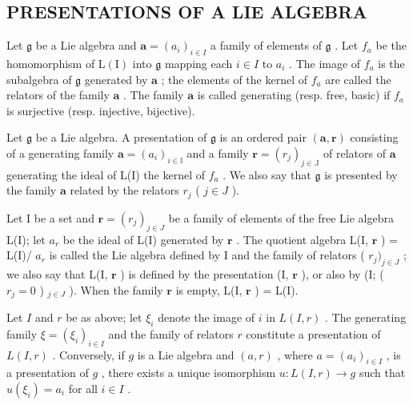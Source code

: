 \subsection{PRESENTATIONS OF A LIE ALGEBRA}

Let \(\mathfrak{g}\) be a Lie algebra and \(\pmb{a} = (a_i)_{i\in I}\) a family of elements of \(\mathfrak{g}\) . Let \(f_{a}\) be the homomorphism of \(\mathrm{L(I)}\) into \(\mathfrak{g}\) mapping each \(i\in I\) to \(a_{i}\) . The image of \(f_{a}\) is the subalgebra of \(\mathfrak{g}\) generated by \(\pmb{a}\) ; the elements of the kernel of \(f_{a}\) are called the relators of the family \(\pmb{a}\) . The family \(\pmb{a}\) is called generating (resp. free, basic) if \(f_{a}\) is surjective (resp. injective, bijective).

Let \(\mathfrak{g}\) be a Lie algebra. A presentation of \(\mathfrak{g}\) is an ordered pair \((\boldsymbol{a},\boldsymbol{r})\) consisting of a generating family \(\boldsymbol{a} = (a_{i})_{i\in \mathbb{I}}\) and a family \(\boldsymbol{r} = (r_j)_{j\in \mathbb{J}}\) of relators of \(\boldsymbol{a}\) generating the ideal of L(I) the kernel of \(f_{a}\) . We also say that \(\mathfrak{g}\) is presented by the family \(\boldsymbol{a}\) related by the relators \(r_j\) ( \(j\in J\) ).

Let I be a set and \(\pmb{r} = (r_j)_{j \in J}\) be a family of elements of the free Lie algebra L(I); let \(a_r\) be the ideal of L(I) generated by \(\pmb{r}\) . The quotient algebra L(I, \(\pmb{r}\) ) = L(I)/ \(a_r\) is called the Lie algebra defined by I and the family of relators ( \(r_j)_{j \in J}\) ; we also say that L(I, \(\pmb{r}\) ) is defined by the presentation (I, \(\pmb{r}\) ), or also by (I; ( \(r_j = 0\) ) \(_{j \in J}\) ). When the family \(\pmb{r}\) is empty, L(I, \(\pmb{r}\) ) = L(I).

Let \(I\) and \(r\) be as above; let \(\xi_i\) denote the image of \(i\) in \(L(I, r)\) . The generating family \(\xi = (\xi_i)_{i \in I}\) and the family of relators \(r\) constitute a presentation of \(L(I, r)\) . Conversely, if \(g\) is a Lie algebra and \((a, r)\) , where \(a = (a_i)_{i \in I}\) , is a presentation of \(g\) , there exists a unique isomorphism \(u: L(I, r) \to g\) such that \(u(\xi_i) = a_i\) for all \(i \in I\) .

